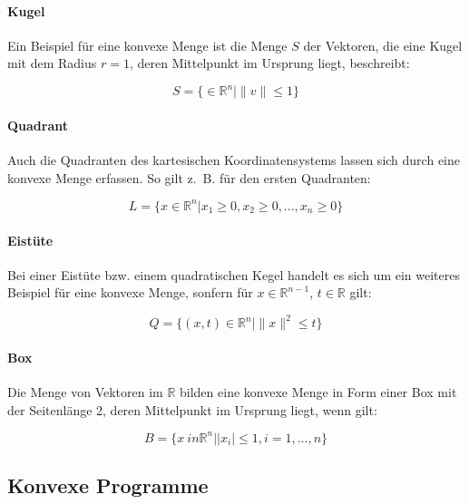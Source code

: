 \begin{theorem}
\begin{Def}
\begin{Def}
\paragraph{Kugel}

Ein Beispiel für eine konvexe Menge ist die Menge $S$ der Vektoren, die eine Kugel mit dem Radius $r = 1$, deren Mittelpunkt im Ursprung liegt, beschreibt:

\begin{equation*}
S = \{ \in \mathbb{R}^{n} | \|v\| \le 1\}
\end{equation*}

\paragraph{Quadrant}

Auch die Quadranten des kartesischen Koordinatensystems lassen sich durch eine konvexe Menge erfassen. So gilt z.~B. für den ersten Quadranten:

\begin{equation*}
L = \{ x \in \mathbb{R}^{n} | x_1 \ge 0, x_2 \ge 0, ..., x_n \ge 0\}
\end{equation*}

\paragraph{Eistüte}

Bei einer Eistüte bzw. einem quadratischen Kegel handelt es sich um ein weiteres Beispiel für eine konvexe Menge, sonfern für $x \in \mathbb{R}^{n-1}$, $t \in \mathbb{R}$ gilt:

\begin{equation*}
Q = \{(x, t) \in \mathbb{R}^{n} | \|x\|^{2} \le t\}
\end{equation*}

\paragraph{Box}

Die Menge von Vektoren im $\mathbb{R}$ bilden eine konvexe Menge in Form einer Box mit der Seitenlänge 2, deren Mittelpunkt im Ursprung liegt, wenn gilt:

\begin{equation*}
B = \{x \ in \mathbb{R}^{n} | |x_{i}| \le 1, i = 1, ..., n\}
\end{equation*}

\subsection{Konvexe Programme}


\end{Def}
\end{Def}
\end{theorem}
